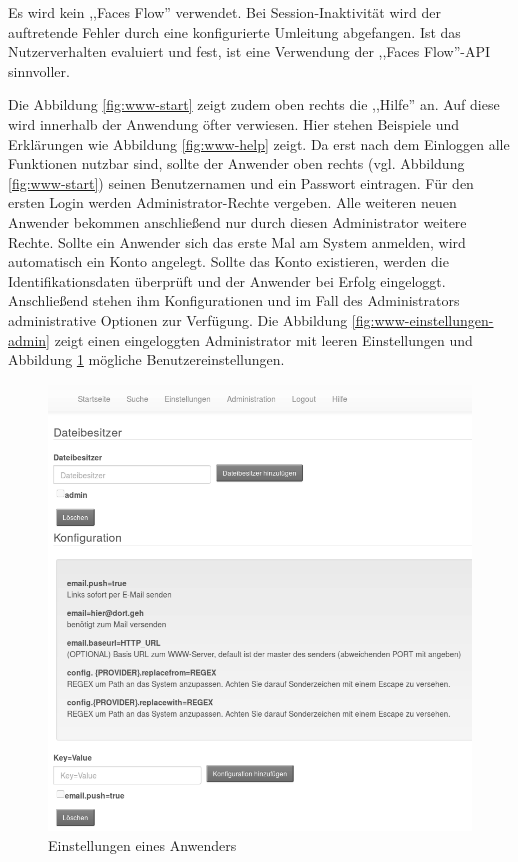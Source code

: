 \documentclass[oneside, ngerman, toc=bibliography,bibliography=totoc,listof=entryprefix, open=right,numbers=noenddot,fontsize=12pt]{scrbook}
\begin{document}
Es wird kein ,,Faces Flow'' verwendet. Bei Session-Inaktivität wird der auftretende Fehler durch eine konfigurierte Umleitung abgefangen. Ist das Nutzerverhalten evaluiert und fest, ist eine Verwendung der ,,Faces Flow''-API sinnvoller.

Die Abbildung  \ref{fig:www-start} zeigt zudem oben rechts die ,,Hilfe'' an. Auf diese wird innerhalb der Anwendung öfter verwiesen. Hier stehen Beispiele und Erklärungen wie Abbildung \ref{fig:www-help} zeigt. 
Da erst nach dem Einloggen alle Funktionen nutzbar sind, sollte der Anwender oben rechts (vgl. Abbildung \ref{fig:www-start}) seinen Benutzernamen und ein Passwort eintragen.
Für den ersten Login werden Administrator-Rechte vergeben. Alle weiteren neuen Anwender bekommen anschließend nur durch diesen Administrator weitere Rechte. Sollte ein Anwender sich das erste Mal am System anmelden, wird automatisch ein Konto angelegt. Sollte das Konto existieren, werden die Identifikationsdaten überprüft und der Anwender bei Erfolg eingeloggt.
Anschließend stehen ihm Konfigurationen und im Fall des Administrators administrative Optionen zur Verfügung.
Die Abbildung \ref{fig:www-einstellungen-admin} zeigt einen eingeloggten Administrator mit leeren Einstellungen und Abbildung \ref{fig:www-einstellungen-user} mögliche Benutzereinstellungen.



\begin{figure}[htbp] 
    \centering
    \includegraphics[width=\textwidth]{Masterarbeit_Bilder/www_einstellungen_user.png}
    \caption{Einstellungen eines Anwenders}
    \label{fig:www-einstellungen-user}
\end{figure}  
\end{document}
